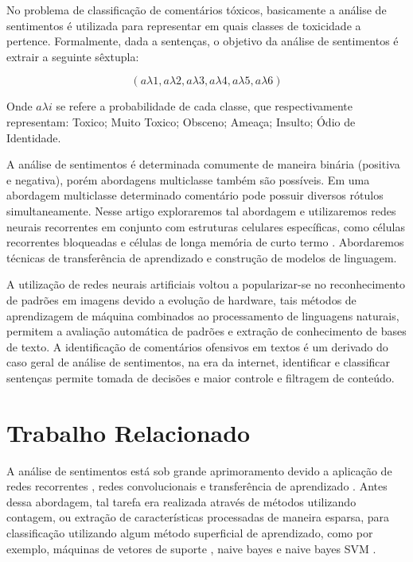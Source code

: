 \documentclass[12pt]{article}
\begin{document}
No problema de classificação de comentários tóxicos, basicamente a análise de sentimentos é utilizada para representar em quais classes de toxicidade a pertence. Formalmente, dada a sentenças, o objetivo da análise de sentimentos é extrair a seguinte sêxtupla:

\[
(a\lambda1, a\lambda2, a\lambda3, a\lambda4, a\lambda5, a\lambda6)
\]

Onde $a \lambda i$ se refere a probabilidade de cada classe, que respectivamente representam: Toxico; Muito Toxico; Obsceno; Ameaça; Insulto; Ódio de Identidade.

A análise de sentimentos é determinada comumente de maneira binária (positiva e negativa), porém abordagens multiclasse também são possíveis. Em uma abordagem multiclasse determinado comentário pode possuir diversos rótulos simultaneamente. Nesse artigo exploraremos tal abordagem e utilizaremos redes neurais recorrentes em conjunto com estruturas celulares específicas, como células recorrentes bloqueadas \cite{DBLP:journals/corr/PascanuGCB13} e células de longa memória de curto termo \cite{sep:97}. Abordaremos técnicas de transferência de aprendizado e construção de modelos de linguagem.

A utilização de redes neurais artificiais voltou a popularizar-se no reconhecimento de padrões em imagens devido a evolução de hardware, tais métodos de aprendizagem de máquina combinados ao processamento de linguagens naturais, permitem a avaliação automática de padrões e extração de conhecimento de bases de texto. A identificação de comentários ofensivos em textos é um derivado do caso geral de análise de sentimentos, na era da internet, identificar e classificar sentenças permite tomada de decisões e maior controle e filtragem de conteúdo. 

\section{Trabalho Relacionado} \label{sec:relacionado}

A análise de sentimentos está sob grande aprimoramento devido a aplicação de redes recorrentes \cite{karpathy:2015}, redes convolucionais \cite{lecun:98} e transferência de aprendizado \cite{DBLP:journals/corr/abs-1801-06146}. Antes dessa abordagem, tal tarefa era realizada através de métodos utilizando contagem, ou extração de características processadas de maneira esparsa, para classificação utilizando algum método superficial de aprendizado, como por exemplo, máquinas de vetores de suporte \cite{DBLP:journals/ml/CortesV95}, naive bayes e naive bayes SVM \cite{wang:2012}.
\end{document}
